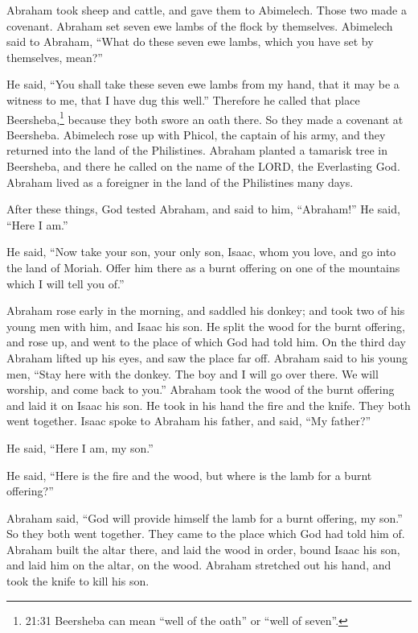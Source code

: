 \myverse{}Abraham took sheep and cattle, and gave them to Abimelech. Those two made a covenant.  \myverse{}Abraham set seven ewe lambs of the flock by themselves.  \myverse{}Abimelech said to Abraham, “What do these seven ewe lambs, which you have set by themselves, mean?”

\myverse{}He said, “You shall take these seven ewe lambs from my hand, that it may be a witness to me, that I have dug this well.”  \myverse{}Therefore he called that place Beersheba,\footnote{21:31 Beersheba can mean “well of the oath” or “well of seven”.} because they both swore an oath there.  \myverse{}So they made a covenant at Beersheba. Abimelech rose up with Phicol, the captain of his army, and they returned into the land of the Philistines.  \myverse{}Abraham planted a tamarisk tree in Beersheba, and there he called on the name of the LORD, the Everlasting God.  \myverse{}Abraham lived as a foreigner in the land of the Philistines many days. 

\mychapter{}
\myverse*{}After these things, God tested Abraham, and said to him, “Abraham!”
He said, “Here I am.”

\quad \myverse{}He said, “Now take your son, your only son, Isaac, whom you love, and go into the land of Moriah. Offer him there as a burnt offering on one of the mountains which I will tell you of.”

\myverse{}Abraham rose early in the morning, and saddled his donkey; and took two of his young men with him, and Isaac his son. He split the wood for the burnt offering, and rose up, and went to the place of which God had told him.  \myverse{}On the third day Abraham lifted up his eyes, and saw the place far off.  \myverse{}Abraham said to his young men, “Stay here with the donkey. The boy and I will go over there. We will worship, and come back to you.”  \myverse{}Abraham took the wood of the burnt offering and laid it on Isaac his son. He took in his hand the fire and the knife. They both went together.  \myverse{}Isaac spoke to Abraham his father, and said, “My father?”

He said, “Here I am, my son.”

He said, “Here is the fire and the wood, but where is the lamb for a burnt offering?”

\myverse{}Abraham said, “God will provide himself the lamb for a burnt offering, my son.” So they both went together.  \myverse{}They came to the place which God had told him of. Abraham built the altar there, and laid the wood in order, bound Isaac his son, and laid him on the altar, on the wood.  \myverse{}Abraham stretched out his hand, and took the knife to kill his son.

